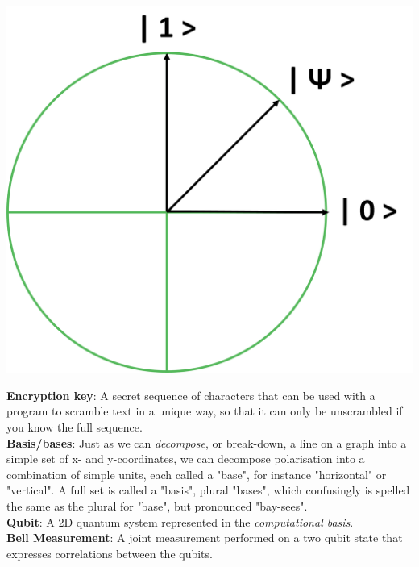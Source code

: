 \documentclass[portrait,final,archA0,fontscale=0.372]{baposter}
\begin{document}
\begin{poster}
{\begin{multicols}{2}
\begin{center}
    \includegraphics[width=0.8\linewidth]{img/qbit_thic} 
\end{center}

\noindent \textbf{Encryption key}: A secret sequence of characters that can be used with a program to scramble text in a unique way, so that it can only be unscrambled if you know the full sequence.\\

\noindent \textbf{Basis/bases}: Just as we can \textit{decompose}, or break-down, a line on a graph into a simple set of x- and y-coordinates, we can decompose polarisation into a combination of simple units, each called a "base", for instance "horizontal" or "vertical". A full set is called a "basis", plural "bases", which confusingly is spelled the same as the plural for "base", but pronounced "bay-sees".\\

\noindent \textbf{Qubit}: A 2D quantum system represented in the \textit{computational basis}. \\

\noindent \textbf{Bell Measurement}: A joint measurement performed on a two qubit state that expresses correlations between the qubits.

\end{multicols}

}

\end{poster}
\end{document}

